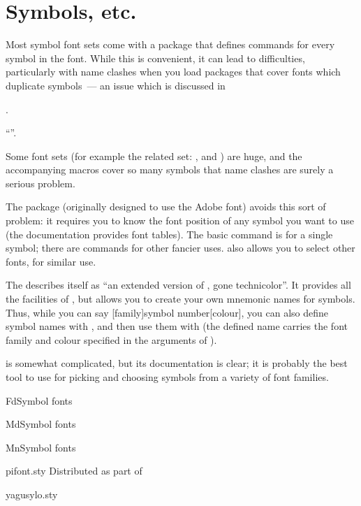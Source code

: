 
\section{Symbols, etc.}


Most symbol font sets come with a package that defines commands for
every symbol in the font.  While this is convenient, it can lead to
difficulties, particularly with name clashes when you load packages
that cover fonts which duplicate symbols~--- an issue which is
discussed in
\begin{narrowversion}
  .
\end{narrowversion}
\begin{wideversion}
  ``''.
\end{wideversion}
Some font sets (for example the related set: ,
 and ) are huge, and the
accompanying macros cover so many symbols that name clashes are surely
a serious problem.

The  package (originally designed to use the Adobe
 font) avoids this sort of problem: it requires
you to know the font position of any symbol you want to use (the
documentation provides font tables).  The basic command is
 for a single symbol; there are commands for
other fancier uses.   also allows you to select other
fonts, for similar use.

The  describes itself as ``an extended version of
, gone technicolor''.  It provides all the facilities
of , but allows you to create your own mnemonic names
for symbols.  Thus, while you can say %
[family]{symbol number}[colour], you can also
define symbol names with , and then use them
with  (the defined name carries the
font family and colour specified in the arguments of
).

 is somewhat complicated, but its documentation is
clear; it is probably the best tool to use for picking and choosing
symbols from a variety of font families.
\begin{ctanrefs}
\item[FdSymbol \nothtml{\rmfamily}fonts]
\item[MdSymbol \nothtml{\rmfamily}fonts]
\item[MnSymbol \nothtml{\rmfamily}fonts]
\item[pifont.sty]Distributed as part of 
\item[yagusylo.sty]
\end{ctanrefs}

